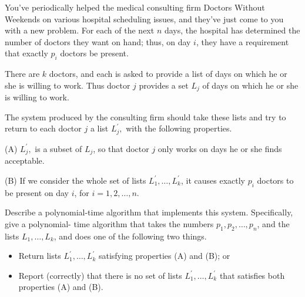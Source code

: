 \newpage
{} %

\problemdes

You’ve periodically helped the medical consulting firm Doctors Without Weekends on various hospital scheduling issues, and they’ve just come to you with a new problem. For each of the next $n$ days, the hospital has determined the number of doctors they want on hand; thus, on day $i$, they have a requirement that exactly $p_i$ doctors be present.

There are $k$ doctors, and each is asked to provide a list of days on which he or she is willing to work. Thus doctor $j$ provides a set $L_j$ of days on which he or she is willing to work.

The system produced by the consulting firm should take these lists and try to return to each doctor $j$ a list $L_j^{\prime},$ with the following properties.

(A) $L_j^{\prime},$ is a subset of $L_j$, so that doctor $j$ only works on days he or she finds acceptable.

(B) If we consider the whole set of lists $L_{1}^{\prime}, \ldots, L_{k}^{\prime}$, it causes exactly $p_i$ doctors to be present on day $i$, for $i = 1,2,\dots,n$.


Describe a polynomial-time algorithm that implements this system. Specifically, give a polynomial- time algorithm that takes the numbers $p_1,p_2, \dots, p_n$, and the lists $L_1,\dots,L_k$, and does one of the following two things.

\begin{itemize}
\item Return lists $L_{1}^{\prime}, \ldots, L_{k}^{\prime}$ satisfying properties (A) and (B); or
\item Report (correctly) that there is no set of lists $L_{1}^{\prime}, \ldots, L_{k}^{\prime}$ that satisfies both properties (A) and (B).
\end{itemize}

















